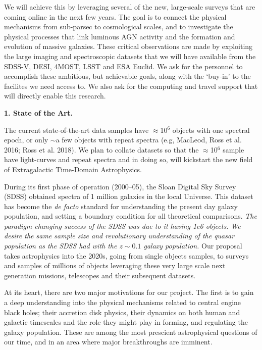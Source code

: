 \documentclass[oneside, a4paper, onecolumn, 11pt]{article}
\begin{document}
\smallskip
\smallskip
\noindent
We will achieve this by leveraging several of the new, large-scale
surveys that are coming online in the next few years.
The goal is to connect the physical mechanisms from sub-parsec to
cosmological scales, and to investigate the physical processes that
link luminous AGN activity and the formation and evolution of massive
galaxies. These critical observations are made by exploiting the large
imaging and spectroscopic datasets that we will have available from
the SDSS-V, DESI, 4MOST, LSST and ESA Euclid.
We ask for the personnel to accomplish these ambitious, but
achievable goals, along with the `buy-in' to the facilites we need
access to.  We also ask for the computing and travel support that will
directly enable this research.


\medskip
\medskip
\noindent
{\bf{\textcolor{Cerulean}{1. State of the Art.}}}

\noindent
The current state-of-the-art data samples have $\approx$10$^{6}$ objects
with one spectral epoch, or only $\sim$a few objects with repeat
spectra (e.g, MacLeod, Ross et al. 2016; Ross et al. 2018).  
We plan to collate datasets so that the $\approx$10$^{6}$ sample have 
light-curves and repeat spectra and in doing so, will kickstart the new field of
Extragalactic Time-Domain Astrophysics.

\noindent
During its first phase of operation (2000–05), the Sloan Digital Sky
Survey (SDSS) obtained spectra of 1 million galaxies in the local
Universe. This dataset has become the {\it de facto} standard for
understanding the present day galaxy population, and setting a
boundary condition for all theoretical comparisons.
{\it The paradigm changing success of the SDSS was due to it having 1e6 objects. 
We desire the same sample size and revolutionary understanding of the quasar 
population as the SDSS had with the $z\sim0.1$ galaxy population.}
Our proposal takes astrophysics into the 2020s, going from single
objects samples, to surveys and samples of millions of objects
leveraging these very large scale next generation
missions, telescopes and their subsequent datasets.

\noindent
At its heart, there are two major motivations for our project.  The
first is to gain a deep understanding into the physical mechanisms
related to central engine black holes; their accretion disk physics,
their dynamics on both human and galactic timescales and the role they
might play in forming, and regulating the galaxy population. These are
among the most prescient astrophysical questions of our time, and in
an area where major breakthroughs are imminent.
\end{document}
